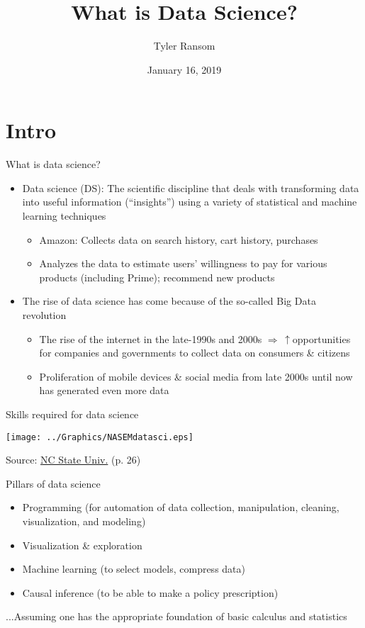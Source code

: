 \documentclass[english,aspectratio=169,12pt,xcolor=dvipsnames]{beamer}
\title{What is Data Science?}
\author{Tyler Ransom}
\institute[OU Econ]{\normalsize{University of Oklahoma, Dept. of Economics}}
\date{January 16, 2019}
\begin{document}
{
\frame[noframenumbering]{\titlepage}
}


\section{Intro}
\begin{frame}{What is data science?}
\begin{itemize}
\item \alert{Data science (DS):} The scientific discipline that deals with transforming data into useful information (``insights'') using a variety of statistical and machine learning techniques
    \begin{itemize}
    \item \alert{Amazon:} Collects data on search history, cart history, purchases
    \item Analyzes the data to estimate users' willingness to pay for various products (including Prime); recommend new products
    \end{itemize}
\item The rise of data science has come because of the so-called Big Data revolution
    \begin{itemize}
    \item The rise of the internet in the late-1990s and 2000s $\Rightarrow \,\uparrow$opportunities for companies and governments to collect data on consumers \& citizens
    \item Proliferation of mobile devices \& social media from late 2000s until now has generated even more data
    \end{itemize}
\end{itemize}
\end{frame}


\begin{frame}{Skills required for data science}
\begin{center}
\texttt{[image: ../Graphics/NASEMdatasci.eps]}
\end{center}
{\scriptsize Source: \href{http://sites.nationalacademies.org/cs/groups/cstbsite/documents/webpage/cstb_181680.pdf}{NC State Univ.} (p. 26)}
\end{frame}

\begin{frame}{Pillars of data science}
\begin{itemize}
\item Programming (for automation of data collection, manipulation, cleaning, visualization, and modeling)
\item Visualization \& exploration
\item Machine learning (to select models, compress data)
\item Causal inference (to be able to make a policy prescription)
\end{itemize}
...Assuming one has the appropriate foundation of basic calculus and statistics
\end{frame}
\end{document}

